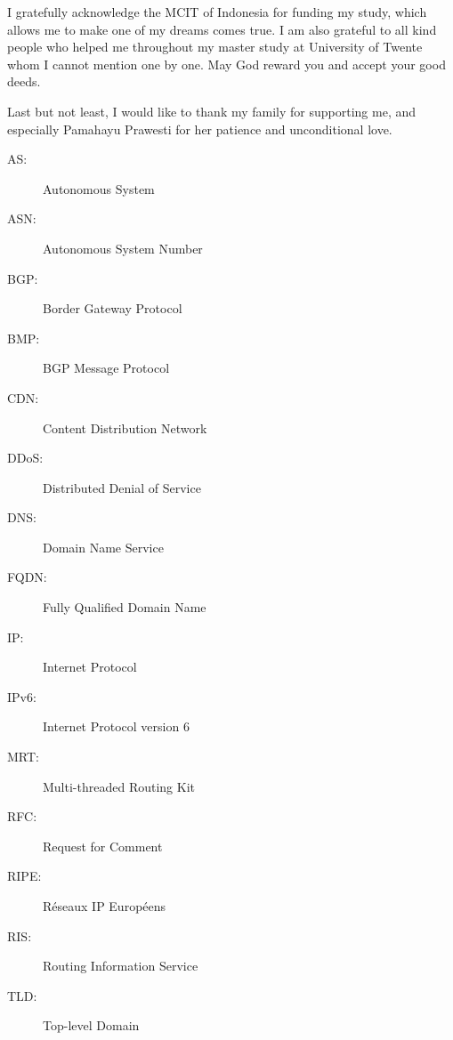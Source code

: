 \documentclass[12pt,toc=bib,toc=listof]{scrreprt}
\begin{document}
I gratefully acknowledge the MCIT of Indonesia for funding my study, which allows me to make one of my dreams comes true. I am also grateful to all kind people who helped me throughout my master study at University of Twente whom I cannot mention one by one. May God reward you and accept your good deeds.

Last but not least, I would like to thank my family for supporting me, and especially Pamahayu Prawesti for her patience and unconditional love. 



\tableofcontents

\label{sec:abbr}

\begin{description}
  \item[AS:] Autonomous System	
  \item[ASN:] Autonomous System Number
  \item[BGP:] Border Gateway Protocol
  \item[BMP:] BGP Message Protocol
  \item[CDN:] Content Distribution Network 
  \item[DDoS:] Distributed Denial of Service
  \item[DNS:] Domain Name Service
  \item[FQDN:] Fully Qualified Domain Name
  \item[IP:] Internet Protocol  
  \item[IPv6:] Internet Protocol version 6
  \item[MRT:] Multi-threaded Routing Kit  
  \item[RFC:] Request for Comment
  \item[RIPE:] Réseaux IP Européens
  \item[RIS:] Routing Information Service
  \item[TLD:] Top-level Domain
\end{description}


\listoffigures

\listoftables


\newpage
{}












%
%
\medskip
\printbibliography
\end{document}
